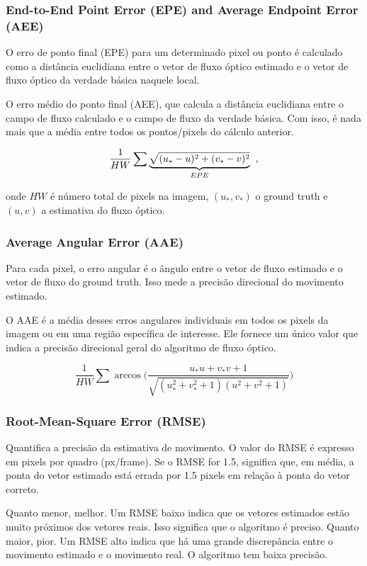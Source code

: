 \documentclass[12pt, a4paper]{article}
\begin{document}
\subsubsection{End-to-End Point Error (EPE) and Average Endpoint Error (AEE)}

O erro de ponto final (EPE) para um determinado pixel ou ponto é calculado como a distância euclidiana entre o vetor de fluxo óptico estimado e o vetor de fluxo óptico da verdade básica naquele local.

O erro médio do ponto final (AEE), que calcula a distância euclidiana entre o campo de fluxo calculado e o campo de fluxo da verdade básica. Com isso, é nada mais que a média entre todos os pontos/pixels do cálculo anterior.

\[ \frac{1}{HW} \sum \underbrace{\sqrt{(u_* - u)^2 + (v_* - v)^2}}_{EPE}\hspace{0.2cm}, \]

onde $HW$ é número total de pixels na imagem, $(u_*, v_*)$ o ground truth e $(u,v)$ a estimativa do fluxo óptico.

\subsubsection{Average Angular Error (AAE)}

Para cada pixel, o erro angular é o ângulo entre o vetor de fluxo estimado e o vetor de fluxo do ground truth. Isso mede a precisão direcional do movimento estimado.

O AAE é a média desses erros angulares individuais em todos os pixels da imagem ou em uma região específica de interesse. Ele fornece um único valor que indica a precisão direcional geral do algoritmo de fluxo óptico.

\[ \frac{1}{HW} \sum \arccos \Bigg( \frac{u_*u + v_*v + 1}{\sqrt{(u_*^2 + v_*^2 +1)(u^2 + v^2 + 1)}}\Bigg) \]

\subsubsection{Root-Mean-Square Error (RMSE)}

Quantifica a precisão da estimativa de movimento. O valor do RMSE é expresso em pixels por quadro (px/frame). Se o RMSE for 1.5, significa que, em média, a ponta do vetor estimado está errada por 1.5 pixels em relação à ponta do vetor correto.

Quanto menor, melhor. Um RMSE baixo indica que os vetores estimados estão muito próximos dos vetores reais. Isso significa que o algoritmo é preciso. Quanto maior, pior. Um RMSE alto indica que há uma grande discrepância entre o movimento estimado e o movimento real. O algoritmo tem baixa precisão.
\end{document}
